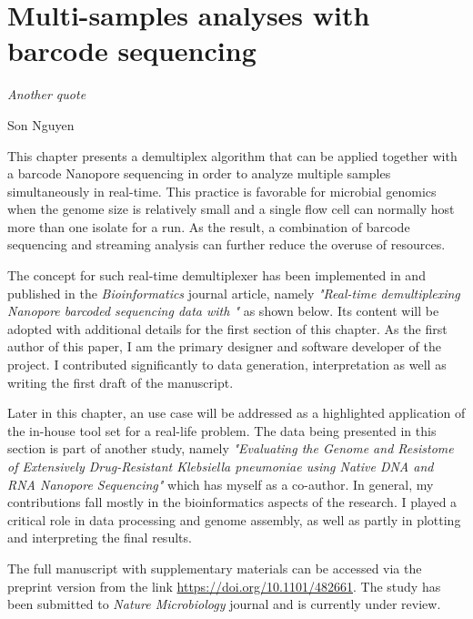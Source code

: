 \chapter{Multi-samples analyses with barcode sequencing}\label{ch:npbarcode}
\thispagestyle{empty}
\vspace*{\fill}
\epigraph{\emph{Another quote}}
{Son Nguyen}

\clearpage
This chapter presents a demultiplex algorithm that can be applied together with a barcode Nanopore sequencing in order to analyze multiple samples simultaneously in real-time. This practice is favorable for microbial genomics when the genome size is relatively small and a single flow cell can normally host more than one isolate for a run. As the result, a combination of barcode sequencing and streaming analysis can further reduce the overuse of resources.

The concept for such real-time demultiplexer has been implemented in \npbarcode{} and published in the \emph{Bioinformatics} journal article, namely \emph{"Real-time demultiplexing Nanopore barcoded sequencing data with \npbarcode{}"} as shown below. Its content will be adopted with additional details for the first section of this chapter. 
As the first author of this paper, I am the primary designer and software developer of the project. I contributed significantly to data generation, interpretation as well as writing the first draft of the manuscript.

Later in this chapter, an use case will be addressed as a highlighted application of the in-house tool set for a real-life problem.
The data being presented in this section is part of another study, namely \emph{"Evaluating the Genome and Resistome of Extensively Drug-Resistant Klebsiella pneumoniae using Native DNA and RNA Nanopore Sequencing"} which has myself as a co-author. 
In general, my contributions fall mostly in the bioinformatics aspects of the research.
I played a critical role in data processing and genome assembly, as well as partly in plotting and interpreting the final results.

The full manuscript with supplementary materials can be accessed via the preprint version from the link \url{https://doi.org/10.1101/482661}. The study has been submitted to \emph{Nature Microbiology} journal and is currently under review.

